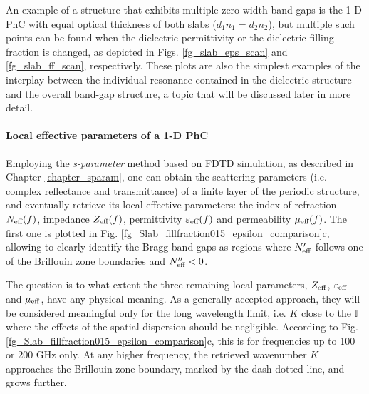 An example of a structure that exhibits multiple zero-width band gaps is the 1-D PhC with equal optical thickness of both slabs ($d_1 n_1 = d_2 n_2$), but multiple such points can be found when the dielectric permittivity or the dielectric filling fraction is changed, as depicted in Figs. \ref{fg_slab_eps_scan} and \ref{fg_slab_ff_scan}, respectively. These plots are also the simplest examples of the interplay between the individual resonance contained in the dielectric structure and the overall band-gap structure, a topic that will be discussed later in more detail.

\paragraph{Local effective parameters of a 1-D PhC}%
Employing the \textit{s-parameter} method based on FDTD simulation, as described in Chapter \ref{chapter_sparam}, one can obtain the scattering parameters (i.e. complex reflectance and transmittance) of a finite layer of the periodic structure, and eventually retrieve its local effective parameters: the index of refraction $N_{\text{eff} }(f)$, impedance $Z_{\text{eff} }(f)$, permittivity $\varepsilon_{\text{eff} }(f)$ and permeability $\mu_{\text{eff} }(f)$. The first one is plotted in Fig. \ref{fg_Slab_fillfraction015_epsilon_comparison}c, allowing to clearly identify the Bragg band gaps as regions where $N_{\text{eff} }'$ follows one of the Brillouin zone boundaries and $N_{\text{eff} }'' < 0$.

The question is to what extent the three remaining local parameters, $Z_{\text{eff} }$, $\varepsilon_{\text{eff} }$ and $\mu_{\text{eff} }$, have any physical meaning. As a generally accepted approach, they will be considered meaningful only for the long wavelength limit, i.e. $K$ close to the $\mathbb{\Gamma}$ where the effects of the spatial dispersion should be negligible. According to Fig. \ref{fg_Slab_fillfraction015_epsilon_comparison}c, this is for frequencies up to 100 or 200 GHz only. At any higher frequency, the retrieved wavenumber $K$ approaches the Brillouin zone boundary, marked by the dash-dotted line, and grows further.

